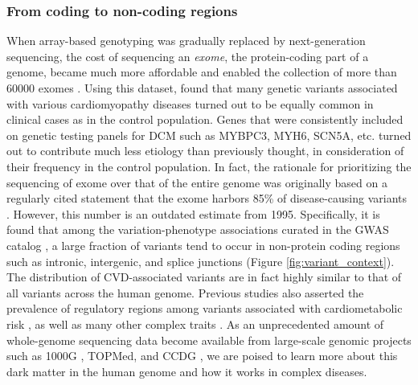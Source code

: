 \documentclass[letter]{bioinfo}
\begin{document}
\subsubsection*{From coding to non-coding regions}	
	When array-based genotyping was gradually replaced by next-generation sequencing, the cost of sequencing an \textit{exome}, the protein-coding part of a genome, became much more affordable and enabled the collection of more than 60000 exomes \citep{Lek:2016:Analysis}. Using this dataset, \cite{Walsh:2017:Reassessment} found that many genetic variants associated with various cardiomyopathy diseases turned out to be equally common in clinical cases as in the control population. Genes that were consistently included on genetic testing panels for DCM such as MYBPC3, MYH6, SCN5A, etc. turned out to contribute much less etiology than previously thought, in consideration of their frequency in the control population.  In fact, the rationale for prioritizing the sequencing of exome over that of the entire genome was originally based on a regularly cited statement that the exome harbors 85\% of disease-causing variants \citep{Antonarakis:2001:nature}.  However, this number is an outdated estimate from 1995.  Specifically, it is found that among the variation-phenotype associations curated in the GWAS catalog \citep{MacArthur:2017:new}, a large fraction of variants tend to occur in non-protein coding regions such as intronic, intergenic, and splice junctions (Figure \ref{fig:variant_context}). The distribution of CVD-associated variants are in fact highly similar to that of all variants across the human genome. Previous studies also asserted the prevalence of regulatory regions among variants associated with cardiometabolic risk \citep{Franzen:2016:Cardiometabolic}, as well as many other complex traits \citep{Pickrell:2014:Joint}. As an unprecedented amount of whole-genome sequencing data become available from large-scale genomic projects such as 1000G  \citep{1000G:2015:global}, TOPMed\citep{NHLBI:2014:TransOmics}, and CCDG \citep{NHGRI:2016:CCDG}, we are poised to learn more about this dark matter in the human genome and how it works in complex diseases.
\end{document}
